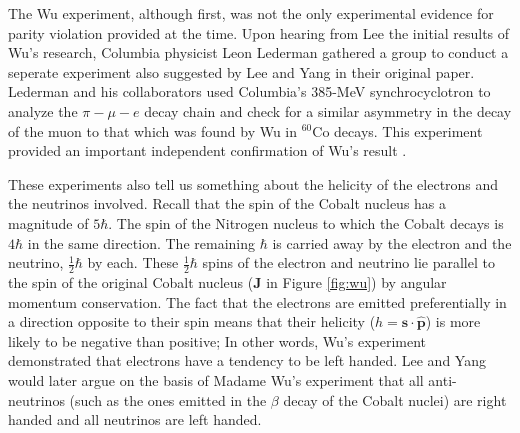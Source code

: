 \documentclass[12pt]{book}
\begin{document}
The Wu experiment, although first, was not the only experimental evidence for parity violation provided at the time. Upon hearing from Lee the initial results of Wu's research, Columbia physicist Leon Lederman gathered a group to conduct a seperate experiment also suggested by Lee and Yang in their original paper. Lederman and his collaborators used Columbia's 385-MeV synchrocyclotron to analyze the $\pi-\mu-e$ decay chain and check for a similar asymmetry in the decay of the muon to that which was found by Wu in $^{60}$Co decays. This experiment provided an important independent confirmation of Wu's result \cite{lederman}.

These experiments also tell us something about the helicity of the electrons and the neutrinos involved. Recall that the spin of the Cobalt nucleus has a magnitude of $5\hbar$. The spin of the Nitrogen nucleus to which the Cobalt decays is $4\hbar$ in the same direction. The remaining $\hbar$ is carried away by the electron and the neutrino, $\frac{1}{2}\hbar$ by each. These $\frac{1}{2}\hbar$ spins of the electron and neutrino lie parallel to the spin of the original Cobalt nucleus ($\mathbf{J}$ in Figure \ref{fig:wu}) by angular momentum conservation. The fact that the electrons are emitted preferentially in a direction opposite to their spin means that their helicity ($h=\mathbf{s}\cdot \hat{\mathbf{p}}$) is more likely to be negative than positive; In other words, Wu's experiment demonstrated that electrons have a tendency to be left handed. Lee and Yang would later argue on the basis of Madame Wu's experiment that all anti-neutrinos (such as the ones emitted in the $\beta$ decay of the Cobalt nuclei) are right handed and all neutrinos are left handed.
\end{document}

